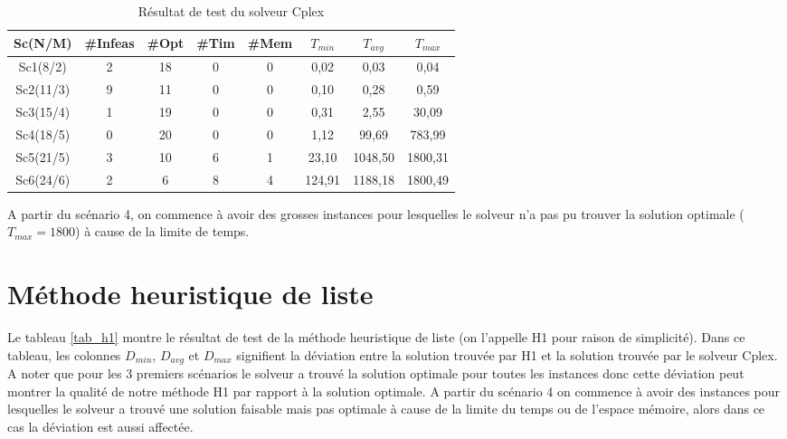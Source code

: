 \begin{table}[h]
    \centering
    \begin{tabular}{|c|c|c|c|c|c|c|c|}
    	\hline
    	Sc(N/M)	& \#Infeas & \#Opt	& \#Tim & \#Mem & $T_{min}$ & $T_{avg}$	& $T_{max}$ \\ \hline
Sc1(8/2) &2	&18	&0	&0&	0,02	&0,03	&0,04   \\ \hline
Sc2(11/3)&9	&11	&0	&0&	0,10	&0,28	&0,59	\\ \hline
Sc3(15/4)&1	&19	&0	&0&	0,31	&2,55	&30,09  \\ \hline
Sc4(18/5)&0	&20	&0	&0&	1,12	&99,69	&783,99 \\ \hline
Sc5(21/5)&3	&10	&6	&1&	23,10	&1048,50&1800,31\\ \hline
Sc6(24/6)&2	&6	&8	&4&	124,91	&1188,18&1800,49\\ \hline
    \end{tabular}
    \caption{Résultat de test du solveur Cplex}
    \label{tab_cplex}
\end{table}
\bigskip

A partir du scénario 4, on commence à avoir des grosses instances pour lesquelles le solveur n'a pas pu trouver la solution optimale ($T_{max}=1800$) à cause de la limite de temps.

\section{Méthode heuristique de liste}
Le tableau \ref{tab_h1} montre le résultat de test de la méthode heuristique de liste (on l'appelle H1 pour raison de simplicité). Dans ce tableau, les colonnes $D_{min}$, $D_{avg}$ et $D_{max}$ signifient la déviation entre la solution trouvée par H1 et la solution trouvée par le solveur Cplex. A noter que pour les 3 premiers scénarios le solveur a trouvé la solution optimale pour toutes les instances donc cette déviation peut montrer la qualité de notre méthode H1 par rapport à la solution optimale. A partir du scénario 4 on commence à avoir des instances pour lesquelles le solveur a trouvé une solution faisable mais pas optimale à cause de la limite du temps ou de l'espace mémoire, alors dans ce cas la déviation est aussi affectée.

